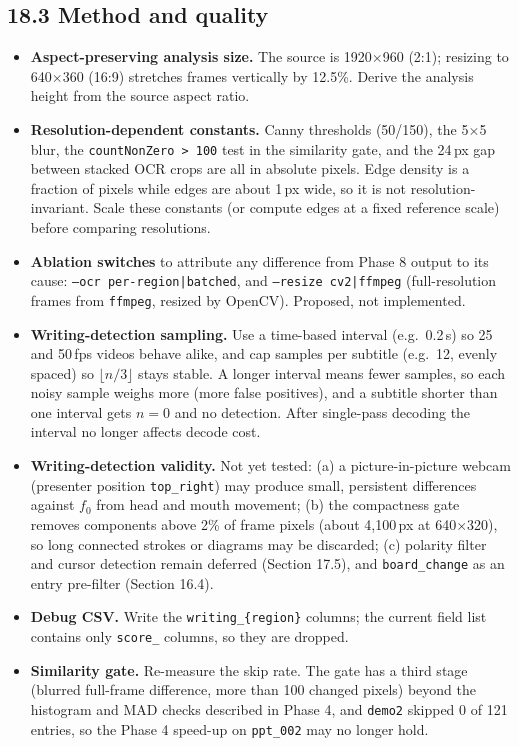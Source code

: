 \documentclass[11pt]{article}
\begin{document}
\subsection*{18.3 Method and quality}
\begin{itemize}[leftmargin=1.2em]
    \item \textbf{Aspect-preserving analysis size.} The source is 1920$\times$960 (2:1); resizing to 640$\times$360 (16:9) stretches frames vertically by 12.5\%. Derive the analysis height from the source aspect ratio.
    \item \textbf{Resolution-dependent constants.} Canny thresholds (50/150), the 5$\times$5 blur, the \texttt{countNonZero > 100} test in the similarity gate, and the 24\,px gap between stacked OCR crops are all in absolute pixels. Edge density is a fraction of pixels while edges are about 1\,px wide, so it is not resolution-invariant. Scale these constants (or compute edges at a fixed reference scale) before comparing resolutions.
    \item \textbf{Ablation switches} to attribute any difference from Phase 8 output to its cause: \texttt{--ocr per-region|batched}, and \texttt{--resize cv2|ffmpeg} (full-resolution frames from \texttt{ffmpeg}, resized by OpenCV). Proposed, not implemented.
    \item \textbf{Writing-detection sampling.} Use a time-based interval (e.g.\ 0.2\,s) so 25 and 50\,fps videos behave alike, and cap samples per subtitle (e.g.\ 12, evenly spaced) so $\lfloor n/3 \rfloor$ stays stable. A longer interval means fewer samples, so each noisy sample weighs more (more false positives), and a subtitle shorter than one interval gets $n=0$ and no detection. After single-pass decoding the interval no longer affects decode cost.
    \item \textbf{Writing-detection validity.} Not yet tested: (a) a picture-in-picture webcam (presenter position \texttt{top\_right}) may produce small, persistent differences against $f_0$ from head and mouth movement; (b) the compactness gate removes components above 2\% of frame pixels (about 4{,}100\,px at 640$\times$320), so long connected strokes or diagrams may be discarded; (c) polarity filter and cursor detection remain deferred (Section 17.5), and \texttt{board\_change} as an entry pre-filter (Section 16.4).
    \item \textbf{Debug CSV.} Write the \texttt{writing\_\{region\}} columns; the current field list contains only \texttt{score\_} columns, so they are dropped.
    \item \textbf{Similarity gate.} Re-measure the skip rate. The gate has a third stage (blurred full-frame difference, more than 100 changed pixels) beyond the histogram and MAD checks described in Phase 4, and \texttt{demo2} skipped 0 of 121 entries, so the Phase 4 speed-up on \texttt{ppt\_002} may no longer hold.
\end{itemize}
\end{document}
